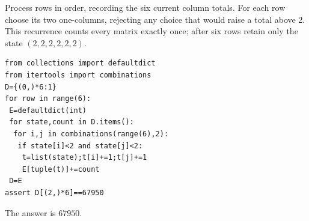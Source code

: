 Process rows in order, recording the six current column totals. For each row choose its two one-columns, rejecting any choice that would raise a total above 2. This recurrence counts every matrix exactly once; after six rows retain only the state $(2,2,2,2,2,2)$.
\begin{verbatim}
from collections import defaultdict
from itertools import combinations
D={(0,)*6:1}
for row in range(6):
 E=defaultdict(int)
 for state,count in D.items():
  for i,j in combinations(range(6),2):
   if state[i]<2 and state[j]<2:
    t=list(state);t[i]+=1;t[j]+=1
    E[tuple(t)]+=count
 D=E
assert D[(2,)*6]==67950
\end{verbatim}
The answer is $\boxed{67950}$.

